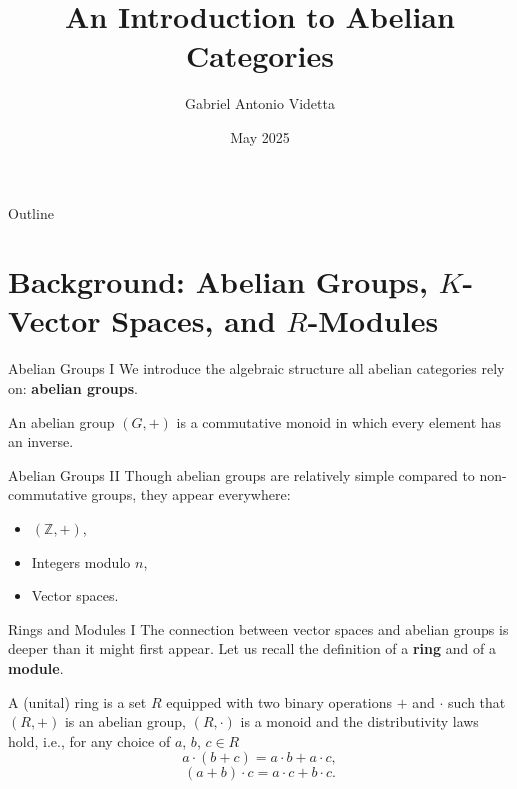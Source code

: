 \documentclass{beamer}
\title{An Introduction to Abelian Categories}
\author{Gabriel Antonio Videtta\texorpdfstring{\vspace*{-13pt}}{}}
\date{May 2025}
\newcommand{\ZZ}{\mathbb{Z}}
\begin{document}
\begin{frame}
    \titlepage
\end{frame}


\begin{frame}{Outline}
    \tableofcontents
\end{frame}



\section{Background: Abelian Groups, \texorpdfstring{$K$}{K}-Vector Spaces, and \texorpdfstring{$R$}{R}-Modules}

\begin{frame}{Abelian Groups I}
    We introduce the algebraic structure all abelian categories
    rely on: \textbf{abelian groups}. \medskip

    \begin{definition}
        An abelian group $(G, +)$ is a commutative monoid
        in which every element has an inverse.
    \end{definition}
\end{frame}

\begin{frame}{Abelian Groups II}
    Though abelian groups are relatively simple compared to
    non-commutative groups, they
    appear everywhere: \smallskip

    \begin{itemize}
        \item $(\ZZ, +)$,
        \item Integers modulo $n$,
        \item Vector spaces.
    \end{itemize}
\end{frame}

\begin{frame}{Rings and Modules I}
    The connection between vector spaces and abelian groups is
    deeper than it might first appear. Let us recall the
    definition of a \textbf{ring} and of a \textbf{module}.

    \begin{definition}
        A (unital) ring is a set $R$ equipped with two binary operations $+$ and $\cdot$
        such that $(R, +)$ is an abelian
        group, $(R, \cdot)$ is a monoid and the distributivity laws hold, i.e.,
        for any choice of $a$, $b$, $c \in R$
        \[
            a \cdot (b + c) = a \cdot b + a \cdot c,
        \]
        \[
            (a + b) \cdot c = a \cdot c + b \cdot c.
        \]
    \end{definition}
\end{frame}
\end{document}
